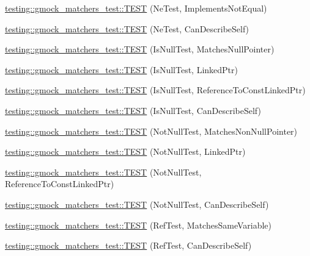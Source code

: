 \begin{DoxyCompactItemize}
\item 
\hyperlink{namespacetesting_1_1gmock__matchers__test_a7319f919e57cf349f733bbdb56177daf}{testing\+::gmock\+\_\+matchers\+\_\+test\+::\+T\+E\+ST} (Ne\+Test, Implements\+Not\+Equal)
\item 
\hyperlink{namespacetesting_1_1gmock__matchers__test_a8a743510a5256803d75c2d7735ec515a}{testing\+::gmock\+\_\+matchers\+\_\+test\+::\+T\+E\+ST} (Ne\+Test, Can\+Describe\+Self)
\item 
\hyperlink{namespacetesting_1_1gmock__matchers__test_ae1c2971c161e051bf52b86b62c51bb95}{testing\+::gmock\+\_\+matchers\+\_\+test\+::\+T\+E\+ST} (Is\+Null\+Test, Matches\+Null\+Pointer)
\item 
\hyperlink{namespacetesting_1_1gmock__matchers__test_a0b1655e1640b7da6e1e7cc35074d9274}{testing\+::gmock\+\_\+matchers\+\_\+test\+::\+T\+E\+ST} (Is\+Null\+Test, Linked\+Ptr)
\item 
\hyperlink{namespacetesting_1_1gmock__matchers__test_afaaf0776096c0ad62de8236ab1b774d7}{testing\+::gmock\+\_\+matchers\+\_\+test\+::\+T\+E\+ST} (Is\+Null\+Test, Reference\+To\+Const\+Linked\+Ptr)
\item 
\hyperlink{namespacetesting_1_1gmock__matchers__test_a5ba91e0b79fcc0b17b1c1e373e741c38}{testing\+::gmock\+\_\+matchers\+\_\+test\+::\+T\+E\+ST} (Is\+Null\+Test, Can\+Describe\+Self)
\item 
\hyperlink{namespacetesting_1_1gmock__matchers__test_a694ea33511eab7822b88d8e74b388534}{testing\+::gmock\+\_\+matchers\+\_\+test\+::\+T\+E\+ST} (Not\+Null\+Test, Matches\+Non\+Null\+Pointer)
\item 
\hyperlink{namespacetesting_1_1gmock__matchers__test_aec956599ef91df968fec972247c7a28a}{testing\+::gmock\+\_\+matchers\+\_\+test\+::\+T\+E\+ST} (Not\+Null\+Test, Linked\+Ptr)
\item 
\hyperlink{namespacetesting_1_1gmock__matchers__test_a9e9560feb52f60475f653c15cc7466aa}{testing\+::gmock\+\_\+matchers\+\_\+test\+::\+T\+E\+ST} (Not\+Null\+Test, Reference\+To\+Const\+Linked\+Ptr)
\item 
\hyperlink{namespacetesting_1_1gmock__matchers__test_a68da7653e6a480c60a3a03fe8afb20fc}{testing\+::gmock\+\_\+matchers\+\_\+test\+::\+T\+E\+ST} (Not\+Null\+Test, Can\+Describe\+Self)
\item 
\hyperlink{namespacetesting_1_1gmock__matchers__test_a199983108927dadee9bd2e03ddd6057d}{testing\+::gmock\+\_\+matchers\+\_\+test\+::\+T\+E\+ST} (Ref\+Test, Matches\+Same\+Variable)
\item 
\hyperlink{namespacetesting_1_1gmock__matchers__test_ad8fc5a82cbb4b5b8147798be06d7059b}{testing\+::gmock\+\_\+matchers\+\_\+test\+::\+T\+E\+ST} (Ref\+Test, Can\+Describe\+Self)

\end{DoxyCompactItemize}

